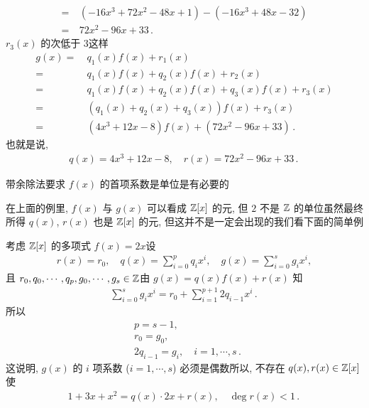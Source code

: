 \begin{example}
\begin{align*}
        = \  & (-16x^3 + 72x^2 - 48x + 1) - (-16x^3 + 48x - 32)  \\
        = \  & 72x^2 - 96x + 33 \period
    \end{align*}
    $r_3 (x)$ 的次低于 $3$\period 这样
    \begin{align*}
        g(x)
        = \  & q_1 (x) f(x) + r_1 (x)                               \\
        = \  & q_1 (x) f(x) + q_2 (x) f(x) + r_2 (x)                \\
        = \  & q_1 (x) f(x) + q_2 (x) f(x) + q_3 (x) f(x) + r_3 (x) \\
        = \  & (q_1 (x) + q_2 (x) + q_3 (x)) f(x) + r_3 (x)         \\
        = \  & (4x^3 + 12x - 8) f(x) + (72x^2 - 96x + 33) \period
    \end{align*}
    也就是说,
    \begin{align*}
        q(x) = 4x^3 + 12x - 8, \quad r(x) = 72x^2 - 96x + 33 \period
    \end{align*}
\end{example}

\begin{remark}
    带余除法要求 $f(x)$ 的首项系数是单位是有必要的\period

    在上面的例里, $f(x)$ 与 $g(x)$ 可以看成 $\mathbb{Z}[x]$ 的元, 但 $2$ 不是 $\mathbb{Z}$ 的单位\period 虽然最终所得 $q(x)$, $r(x)$ 也是 $\mathbb{Z}[x]$ 的元, 但这并不是一定会出现的\period 我们看下面的简单例\period

    考虑 $\mathbb{Z}[x]$ 的多项式 $f(x)=2x$\period 设
    \begin{align*}
        r(x) = r_0, \quad q(x) = \sum_{i=0}^{p} q_i x^i, \quad g(x) = \sum_{i=0}^{s} g_i x^i,
    \end{align*}
    且 $r_0, q_0, \cdots, q_p, g_0, \cdots, g_s \in \mathbb{Z}$\period 由 $g(x) = q(x)f(x) + r(x)$ 知
    \begin{align*}
        \sum_{i=0}^{s} g_i x^i = r_0 + \sum_{i=1}^{p+1} 2q_{i-1} x^i \period
    \end{align*}
    所以
    \begin{align*}
         & p = s - 1,                                 \\
         & r_0 = g_0,                                 \\
         & 2q_{i-1} = g_i, \quad i=1,\cdots,s \period
    \end{align*}
    这说明, $g(x)$ 的 $i$ 项系数 ($i=1,\cdots,s$) 必须是偶数\period 所以, 不存在 $q(x),r(x) \in \mathbb{Z}[x]$ 使
    \begin{align*}
        1 + 3x + x^2 = q(x) \cdot 2x + r(x), \quad \deg r(x) < 1 \period
    \end{align*}
\end{remark}

